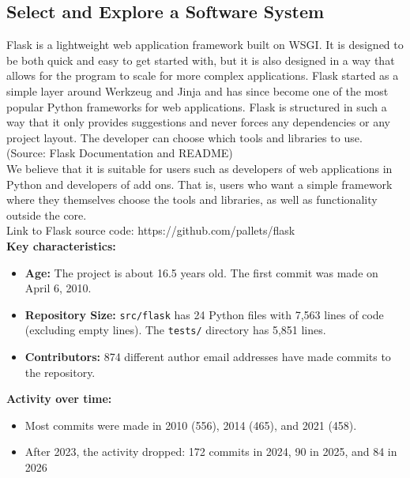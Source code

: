\documentclass[12pt,a4paper]{article}
\begin{document}
\subsection{Select and Explore a Software System}
Flask is a lightweight web application framework built on WSGI. It is designed to be both quick and easy to get started with, but it is also designed in a way that allows for the program to scale for more complex applications. Flask started as a simple layer around Werkzeug and Jinja and has since become one of the most popular Python frameworks for web applications. Flask is structured in such a way that it only provides suggestions and never forces any dependencies or any project layout. The developer can choose which tools and libraries to use. (Source: Flask Documentation \cite{flaskdocs} and README) \\ We believe that it is suitable for users such as developers of web applications in Python and developers of add ons. That is, users who want a simple framework where they themselves choose the tools and libraries, as well as functionality outside the core. \\

Link to Flask source code: https://github.com/pallets/flask \\

\noindent \textbf{Key characteristics:}
\begin{itemize}
    \item \textbf{Age:} The project is about 16.5 years old. The first commit was made on April 6, 2010.
    \item \textbf{Repository Size:} \texttt{src/flask} has 24 Python files with 7,563 lines of code (excluding empty lines). The \texttt{tests/} directory has 5,851 lines.
    \item \textbf{Contributors:} 874 different author email addresses have made commits to the repository.
\end{itemize}

\noindent \textbf{Activity over time:}
\begin{itemize}
    \item Most commits were made in 2010 (556), 2014 (465), and 2021 (458).
    \item After 2023, the activity dropped: 172 commits in 2024, 90 in 2025, and 84 in 2026 
\end{itemize}
\end{document}
